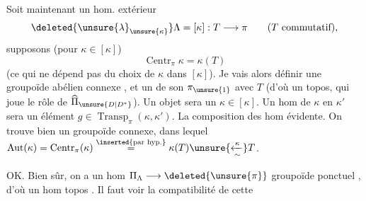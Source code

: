 Soit maintenant un hom. extérieur 
\[
\deleted{\unsure{\lambda}_{\unsure{\kappa}}}\Lambda=[\kappa]:T\longrightarrow\pi
\qquad (T\text{ commutatif}),
\]
supposons (pour \(\kappa\in[\kappa]\))
\[
\operatorname{Centr}_\pi\kappa=\kappa(T)
\]
(ce qui ne dépend pas du choix de \(\kappa\) dans
\([\kappa]\)). Je vais alors définir une
 groupoïde abélien connexe \inserted{\(\Pi_\Lambda\)}, et un
 de son \(\pi_{\unsure{1}}\) avec \(T\) 
(d'où un topos, qui joue le rôle de
\(\widehat{\Pi}_{\unsure{D|D^*}}\)). Un objet sera un \(\kappa\in[\kappa]\).
Un hom de \(\kappa\) en \(\kappa'\) sera un
élément \(g\in\operatorname{Transp}_\pi(\kappa,\kappa')\). 
La composition des hom évidente. On
trouve bien un groupoïde connexe, dans
lequel \(\operatorname{Aut}(\kappa)=\operatorname{Centr}_\pi(\kappa)\overset{\inserted{\text{par hyp.}}}{=}\kappa(T)\unsure{\xleftarrow[\sim]{\kappa}}T\).

OK. Bien sûr, on a un hom
\(\Pi_\Lambda\longrightarrow\deleted{\unsure{\pi}}\) groupoïde ponctuel , d'où
un hom topos  .
Il faut voir la compatibilité de cette

